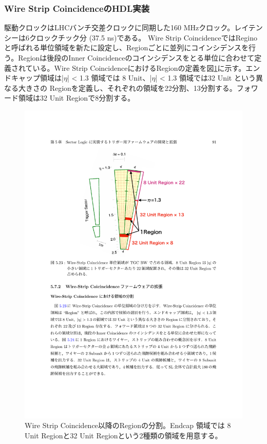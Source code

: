 \subsubsection*{Wire Strip CoincidenceのHDL実装}
駆動クロックはLHCバンチ交差クロックに同期した160 MHzクロック。レイテンシーは6クロックチック分 (37.5 ns)である。
Wire Strip CoincidenceではReginoと呼ばれる単位領域を新たに設定し、Regionごとに並列にコインシデンスを行う。Regionは後段のInner Coincidenceのコインシデンスをとる単位に合わせて定義されている。Wire Strip CoincidenceにおけるRegionの定義を図\ref{WS_region}に示す。エンドキャップ領域は|$\eta$| < 1.3 領域では 8 Unit、|$\eta$| < 1.3 領域では32 Unit という異なる大きさの Regionを定義し、それぞれの領域を22分割、13分割する。フォワード領域は32 Unit Regionで8分割する。

\begin{figure} 
\centering
\includegraphics[width=16cm]{fig/SL/WS_region.pdf}
\caption[Wire Strip Coincidence以降のRegionの分割]{Wire Strip Coincidence以降のRegionの分割\cite{mt_kawamoto}。Endcap 領域では 8 Unit Regionと32 Unit Regionという2種類の領域を用意する。}
\label{WS_region}
\end{figure}


